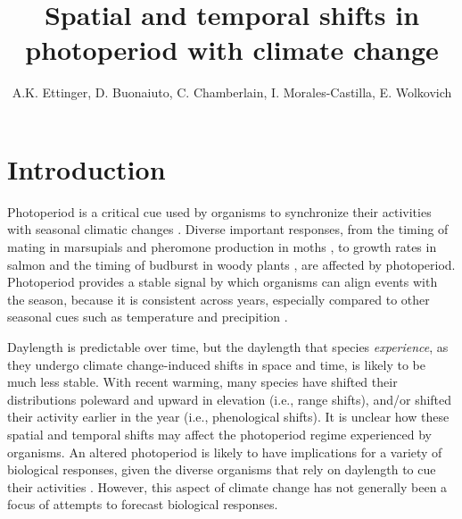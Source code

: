 \documentclass{article}
\begin{document}
 
\title{Spatial and temporal shifts in photoperiod with climate change} %

\author{A.K. Ettinger, D. Buonaiuto, C. Chamberlain, I. Morales-Castilla, E. Wolkovich}
\maketitle  %

\section*{Introduction}
\par Photoperiod is a critical cue used by organisms to synchronize their activities with seasonal climatic changes \citep[e.g.,][]{Hsu:2011,Singh:2017,Basler:2012}. Diverse important responses, from the timing of mating in marsupials \citep{mcallan2006} and pheromone production in moths \citep{linn1996}, to growth rates in salmon and the timing of budburst in woody plants \citep{Flynn:2018,solbakken1994}, are affected by photoperiod. Photoperiod provides a stable signal by which organisms can align events with the season, because it is consistent across years, especially compared to other seasonal cues such as temperature and precipition \citep{saikkonen2012}. 
\par Daylength is predictable over time, but the daylength that species \emph{experience}, as they undergo climate change-induced shifts in space and time, is likely to be much less stable. With recent warming, many species have shifted their distributions poleward and upward in elevation (i.e., range shifts), and/or shifted their activity earlier in the year (i.e., phenological shifts). It is unclear how these spatial and temporal shifts may affect the photoperiod regime experienced by organisms. An altered photoperiod is likely to have implications for a variety of biological responses, given the diverse organisms that rely on daylength to cue their activities \citep[e.g.,][] {mcallan2006,linn1996,Flynn:2018,solbakken1994}. However,  this aspect of climate change has not generally been a focus of attempts to forecast biological responses.
\end{document}

